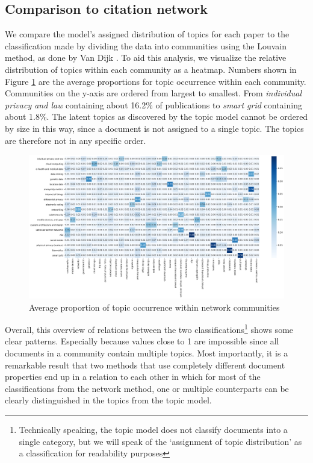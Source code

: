 \documentclass[runningheads]{llncs}
\begin{document}
\subsection{Comparison to citation network}
We compare the model's assigned distribution of topics for each paper to the classification made by dividing the data into communities using the Louvain method, as done by Van Dijk \cite{van_dijk_pillars_nodate}. To aid this analysis, we visualize the relative distribution of topics within each community as a heatmap. Numbers shown in Figure \ref{fig:square} are the average proportions for topic occurrence within each community. Communities on the y-axis are ordered from largest to smallest. From \textit{individual privacy and law} containing about 16.2\% of publications to \textit{smart grid} containing about 1.8\%. The latent topics as discovered by the topic model cannot be ordered by size in this way, since a document is not assigned to a single topic. The topics are therefore not in any specific order.

\begin{figure}
    \includegraphics[width = 1\textwidth]{figures/square.png}
    \caption{Average proportion of topic occurrence within network communities}
    \label{fig:square}
\end{figure}

Overall, this overview of relations between the two classifications\footnote{Technically speaking, the topic model does not classify documents into a single category, but we will speak of the `assignment of topic distribution' as a classification for readability purposes} shows some clear patterns. Especially because values close to 1 are impossible since all documents in a community contain multiple topics. Most importantly, it is a remarkable result that two methods that use completely different document properties end up in a relation to each other in which for most of the classifications from the network method, one or multiple counterparts can be clearly distinguished in the topics from the topic model. 
\end{document}
